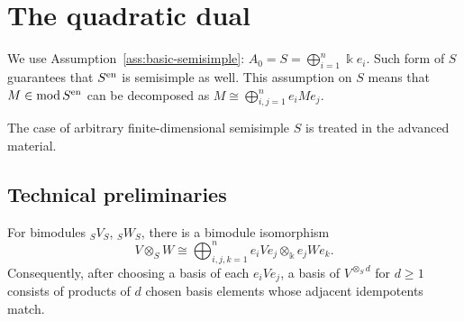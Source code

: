 \section{The quadratic dual}\label{sec:quadratic-dual}


We use Assumption~\ref{ass:basic-semisimple}: $A_0=S=\bigoplus_{i=1}^n\Bbbk e_i$.  Such form of $S$ guarantees that $S^{\mathrm{en}}$ is semisimple as well.
This assumption on $S$ means that $M\in \operatorname{\mathrm{mod}} S^{\mathrm{en}}$ can be decomposed as $M\cong \bigoplus_{i,j=1}^n e_i M e_j$.

The case of arbitrary finite-dimensional semisimple $S$ is treated in the advanced material.

\subsection{Technical preliminaries}

\begin{lemma}\label{lem:idempotent-tensors}
For bimodules ${}_SV_S$, ${}_SW_S$, there is a bimodule isomorphism
\begin{equation}\label{eq:idempotent-tensor-decomposition}
V\otimes_S W\cong\bigoplus_{i,j,k=1}^n e_iVe_j\otimes_\Bbbk e_jWe_k.
\end{equation}
Consequently, after choosing a basis of each $e_iVe_j$, a basis of $V^{\otimes_S d}$ for $d\geq1$ consists of products of $d$ chosen basis elements whose adjacent idempotents match.
\end{lemma}


